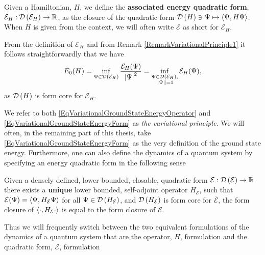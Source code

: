 \begin{definition}
	Given a Hamiltonian, $ H $, we define the \textbf{associated energy quadratic form}, $ \mathcal{E}_H:\mathcal D\left(\mathcal{E}_H\right)\to \mathbb{R} $, as the closure of the quadratic form $ \mathcal D\left(H\right)\ni\Psi\mapsto\left\langle\Psi,H\Psi\right\rangle $. When $ H $ is given from the context, we will often write $ \mathcal{E} $ as short for $ \mathcal{E}_H $.
\end{definition}
\begin{remark}\label{RemarkVariationalPrinciple2}
	From the definition of $\mathcal{E}_H$ and from Remark \ref{RemarkVariationalPrinciple1} it follows straightforwardly that we have \begin{equation}\label{EqVariationalGroundStateEnergyForm}
		E_0(H)=\inf_{\Psi\in \mathcal D\left(\mathcal{E}_H\right)}\frac{\mathcal{E}_H(\Psi)}{\left\lvert \Psi \right\rvert^2}=\inf_{\substack{\Psi\in \mathcal D\left(\mathcal{E}_H\right),\\\left\lVert \Psi \right\rVert=1}}\mathcal{E}_H(\Psi), 
	\end{equation}
	as $ \mathcal D\left(H\right) $ is form core for $\mathcal{E}_H$.
\end{remark}
We refer to both \eqref{EqVariationalGroundStateEnergyOperator} and \eqref{EqVariationalGroundStateEnergyForm} as \emph{the variational principle}.
We will often, in the remaining part of this thesis, take \eqref{EqVariationalGroundStateEnergyForm} as the very definition of the ground state energy. Furthermore, one can also define the dynamics of a quantum system by specifying an energy quadratic form in the following sense
\begin{remark}\label{RemarkOperatorFromQuadraticForm}
	Given a densely defined, lower bounded, closable, quadratic form $ \mathcal{E}:\mathcal D\left(\mathcal{E}\right)\to \mathbb{R} $ there exists a \textbf{unique} lower bounded, self-adjoint operator $ H_\mathcal{E} $, such that $ \mathcal{E}(\Psi)=\left\langle\Psi,H_\mathcal{E}\Psi\right\rangle $ for all $ \Psi\in \mathcal D\left(H_\mathcal{E}\right) $, and $ \mathcal D\left(H_\mathcal{E}\right) $ is form core for $\overline{\mathcal{E}}$, \ie the form closure of $ \left\langle\cdot,H_\mathcal{E}\cdot\right\rangle $ is equal to the form closure of $\mathcal{E}$. 
\end{remark}
Thus we will frequently switch between the two equivalent formulations of the dynamics of a quantum system that are the operator, $ H $, formulation and the quadratic form, $ \mathcal{E} $, formulation
